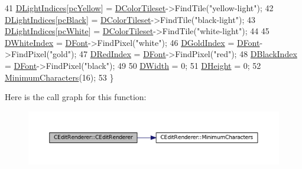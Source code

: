 \begin{DoxyCode}
41     \hyperlink{classCEditRenderer_aa1d5d41e26d759abd3ff5ba8edc4d692}{DLightIndices}[\hyperlink{GameDataTypes_8h_aafb0ca75933357ff28a6d7efbdd7602fabe29a0eabd9c2d47ac0179eb5b252c34}{pcYellow}] = \hyperlink{classCEditRenderer_a43dfa83f85527019c7499e33ecaed149}{DColorTileset}->FindTile(\textcolor{stringliteral}{"yellow-light"});
42     \hyperlink{classCEditRenderer_aa1d5d41e26d759abd3ff5ba8edc4d692}{DLightIndices}[\hyperlink{GameDataTypes_8h_aafb0ca75933357ff28a6d7efbdd7602fa9ae67c5388342a6ed3f5f2e2c09acce9}{pcBlack}] = \hyperlink{classCEditRenderer_a43dfa83f85527019c7499e33ecaed149}{DColorTileset}->FindTile(\textcolor{stringliteral}{"black-light"});
43     \hyperlink{classCEditRenderer_aa1d5d41e26d759abd3ff5ba8edc4d692}{DLightIndices}[\hyperlink{GameDataTypes_8h_aafb0ca75933357ff28a6d7efbdd7602fa3cbd8201421af4b5b5993c7a6847f1bc}{pcWhite}] = \hyperlink{classCEditRenderer_a43dfa83f85527019c7499e33ecaed149}{DColorTileset}->FindTile(\textcolor{stringliteral}{"white-light"});
44     
45     \hyperlink{classCEditRenderer_aaa97fde55438f6ad02cbb365097a2274}{DWhiteIndex} = \hyperlink{classCEditRenderer_afd108ae6cb3e9eeffce881a1ada0f0db}{DFont}->FindPixel(\textcolor{stringliteral}{"white"});
46     \hyperlink{classCEditRenderer_adef6e0cd1cc67b18a196bbac95a7306b}{DGoldIndex} = \hyperlink{classCEditRenderer_afd108ae6cb3e9eeffce881a1ada0f0db}{DFont}->FindPixel(\textcolor{stringliteral}{"gold"});
47     \hyperlink{classCEditRenderer_a77ce4df48e03a8b9245f2045c2c3c4e7}{DRedIndex} = \hyperlink{classCEditRenderer_afd108ae6cb3e9eeffce881a1ada0f0db}{DFont}->FindPixel(\textcolor{stringliteral}{"red"});
48     \hyperlink{classCEditRenderer_a13b03f02ff6673d8df2d6509c17bcccc}{DBlackIndex} = \hyperlink{classCEditRenderer_afd108ae6cb3e9eeffce881a1ada0f0db}{DFont}->FindPixel(\textcolor{stringliteral}{"black"});
49     
50     \hyperlink{classCEditRenderer_ab203e5083f61d3575eb491f170c21d45}{DWidth} = 0;
51     \hyperlink{classCEditRenderer_ade8dedb4f9790d28b38da8ef20a171cb}{DHeight} = 0;
52     \hyperlink{classCEditRenderer_a36726cc31fedec0820076c03186158e7}{MinimumCharacters}(16);
53 \}
\end{DoxyCode}
Here is the call graph for this function\+:
\nopagebreak
\begin{figure}[H]
\begin{center}
\leavevmode
\includegraphics[width=350pt]{classCEditRenderer_a672139544dacbe5fb75dd30663a0bc0b_cgraph}
\end{center}
\end{figure}


